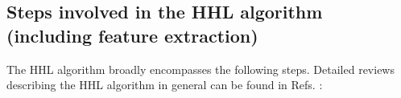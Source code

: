 \documentclass[%
 reprint,
 superscriptaddress,
 amsmath,amssymb,
 aps,
 pra,
floatfix,
nofootinbib,
]{revtex4-2}
\theoremstyle{definition}
\theoremstyle{remark}
\begin{document}
\begin{appendix} 

 \appendix
 \renewcommand{\thesection}{S.\arabic{section}}
 \renewcommand{\thefigure}{S.\arabic{figure}}
 \renewcommand{\thetable}{S.\arabic{table}}
 \renewcommand{\theequation}{S.\arabic{equation}} 
 \renewcommand{\thetheorem}{\thesection.\arabic{theorem}} 
 \renewcommand{\thedefinition}{\thesection. \arabic{definition}}

 \setcounter{section}{0}
 \setcounter{figure}{0}
 \setcounter{equation}{0} 
 \setcounter{theorem}{0}
 \setcounter{definition}{0}

 \makeatletter
 \def\l@subsection#1#2{} 
 \makeatother

\section{Steps involved in the HHL algorithm (including feature extraction)}\label{sm:hhl}

The HHL algorithm \cite{Harrow2009QuantumEquations} broadly encompasses the following steps.  Detailed reviews describing the HHL algorithm in general can be found in Refs. \cite{zaman2023step, lin2022lecture,morales}: 


\end{appendix}
\end{document}
